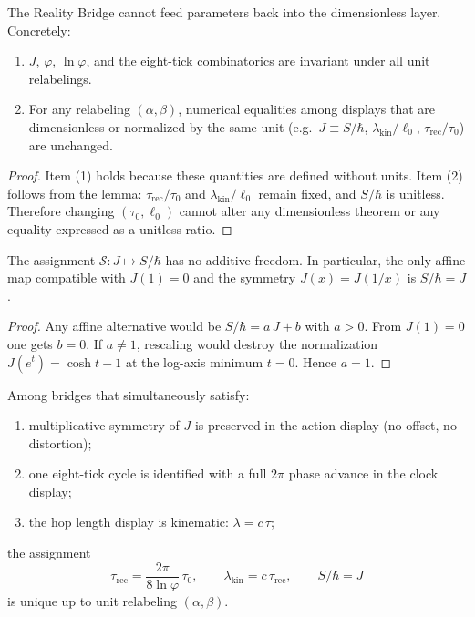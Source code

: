 \documentclass[11pt]{article}
\begin{document}
\begin{theorem}
The Reality Bridge cannot feed parameters back into the dimensionless layer. Concretely:
\begin{enumerate}
\item \(J\), \(\varphi\), \(\ln\varphi\), and the eight-tick combinatorics are invariant under all unit relabelings.
\item For any relabeling \((\alpha,\beta)\), numerical equalities among displays that are dimensionless or normalized by the same unit (e.g.\ \(J\equiv S/\hbar\), \(\lambda_{\mathrm{kin}}/\ell_{0}\), \(\tau_{\mathrm{rec}}/\tau_{0}\)) are unchanged.
\end{enumerate}
\end{theorem}

\begin{proof}
Item (1) holds because these quantities are defined without units. Item (2) follows from the lemma: \(\tau_{\mathrm{rec}}/\tau_{0}\) and \(\lambda_{\mathrm{kin}}/\ell_{0}\) remain fixed, and \(S/\hbar\) is unitless. Therefore changing \((\tau_{0},\ell_{0})\) cannot alter any dimensionless theorem or any equality expressed as a unitless ratio.
\end{proof}

\begin{proposition}
The assignment \(\mathcal{S}:J\mapsto S/\hbar\) has no additive freedom. In particular, the only affine map compatible with \(J(1)=0\) and the symmetry \(J(x)=J(1/x)\) is \(S/\hbar=J\).
\end{proposition}

\begin{proof}
Any affine alternative would be \(S/\hbar=a\,J+b\) with \(a>0\). From \(J(1)=0\) one gets \(b=0\). If \(a\neq 1\), rescaling would destroy the normalization \(J(e^{t})=\cosh t-1\) at the log-axis minimum \(t=0\). Hence \(a=1\).
\end{proof}

\begin{proposition}
Among bridges that simultaneously satisfy:
\begin{enumerate}
\item multiplicative symmetry of \(J\) is preserved in the action display (no offset, no distortion);
\item one eight-tick cycle is identified with a full \(2\pi\) phase advance in the clock display;
\item the hop length display is kinematic: \(\lambda = c\,\tau\);
\end{enumerate}
the assignment
\[
\tau_{\mathrm{rec}}=\frac{2\pi}{8\ln\varphi}\,\tau_{0},\qquad
\lambda_{\mathrm{kin}}=c\,\tau_{\mathrm{rec}},\qquad
S/\hbar=J
\]
is unique up to unit relabeling \((\alpha,\beta)\).
\end{proposition}
\end{document}
